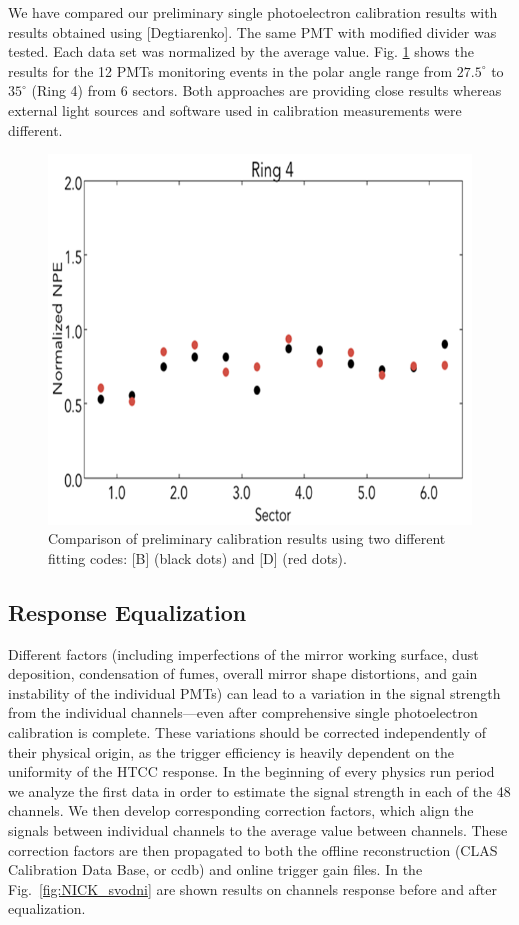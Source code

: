 We have compared our preliminary single photoelectron calibration results with results obtained using [Degtiarenko]. The same PMT with modified divider was tested. Each data set was normalized by the average value. Fig. \ref{fig:WILLIAM_4} shows the results for the 12 PMTs monitoring events in the polar angle range from $27.5^\circ$ to $35^\circ$ (Ring 4) from 6 sectors. Both approaches are providing close results whereas external light sources and software used in calibration measurements were different.

\begin{figure}[ht]
\centering
\includegraphics[width=0.99\linewidth]{images/WILLIAM_4.png}
\caption{Comparison of preliminary calibration results using two different fitting codes: [B] (black dots) and [D] (red dots).}
\label{fig:WILLIAM_4}
\end{figure}

\subsection{Response Equalization} Different factors (including imperfections of the mirror working surface, dust deposition, condensation of fumes, overall mirror shape distortions, and gain instability of the individual PMTs) can lead to a variation in the signal strength from the individual channels---even after comprehensive single photoelectron calibration is complete. These variations should be corrected independently of their physical origin, as the trigger efficiency is heavily dependent on the uniformity of the HTCC response. In the beginning of every physics run period we analyze the first data in order to estimate the signal strength in each of the 48 channels. We then develop corresponding correction factors, which align the signals between individual channels to the average value between channels. These correction factors are then propagated to both the offline reconstruction (CLAS Calibration Data Base, or ccdb) and online trigger gain files. In the Fig.~\ref{fig:NICK_svodni} are shown results on channels response before and after equalization.

